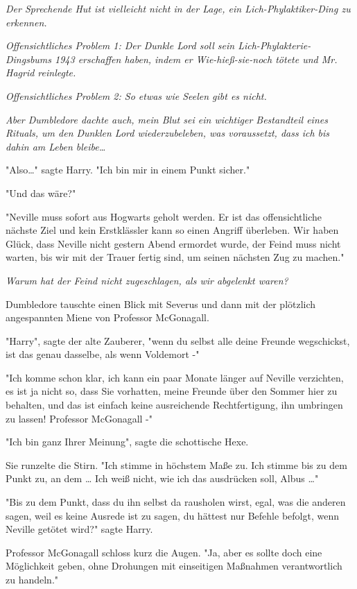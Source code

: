 {\emph{Der Sprechende Hut ist vielleicht nicht in der Lage, ein Lich-Phylaktiker-Ding zu erkennen.}

\emph{Offensichtliches Problem 1: Der Dunkle Lord soll sein Lich-Phylakterie-Dingsbums 1943 erschaffen haben, indem er Wie-hieß-sie-noch tötete und Mr. Hagrid reinlegte.}

\emph{Offensichtliches Problem 2: So etwas wie Seelen gibt es nicht.}

\emph{Aber Dumbledore dachte auch, mein Blut sei ein wichtiger Bestandteil eines Rituals, um den Dunklen Lord wiederzubeleben, was voraussetzt, dass ich bis dahin am Leben bleibe…}

"Also…" sagte Harry. "Ich bin mir in einem Punkt sicher."

"Und das wäre?"

"Neville muss sofort aus Hogwarts geholt werden. Er ist das offensichtliche nächste Ziel und kein Erstklässler kann so einen Angriff überleben. Wir haben Glück, dass Neville nicht gestern Abend ermordet wurde, der Feind muss nicht warten, bis wir mit der Trauer fertig sind, um seinen nächsten Zug zu machen."

\emph{Warum hat der Feind nicht zugeschlagen, als wir abgelenkt waren?}

Dumbledore tauschte einen Blick mit Severus und dann mit der plötzlich angespannten Miene von Professor McGonagall.

"Harry", sagte der alte Zauberer, "wenn du selbst alle deine Freunde wegschickst, ist das genau dasselbe, als wenn Voldemort -"

"Ich komme schon klar, ich kann ein paar Monate länger auf Neville verzichten, es ist ja nicht so, dass Sie vorhatten, meine Freunde über den Sommer hier zu behalten, und das ist einfach keine ausreichende Rechtfertigung, ihn umbringen zu lassen! Professor McGonagall -"

"Ich bin ganz Ihrer Meinung", sagte die schottische Hexe.

Sie runzelte die Stirn. "Ich stimme in höchstem Maße zu. Ich stimme bis zu dem Punkt zu, an dem … Ich weiß nicht, wie ich das ausdrücken soll, Albus …"

"Bis zu dem Punkt, dass du ihn selbst da rausholen wirst, egal, was die anderen sagen, weil es keine Ausrede ist zu sagen, du hättest nur Befehle befolgt, wenn Neville getötet wird?" sagte Harry.

Professor McGonagall schloss kurz die Augen. "Ja, aber es sollte doch eine Möglichkeit geben, ohne Drohungen mit einseitigen Maßnahmen verantwortlich zu handeln."

}
